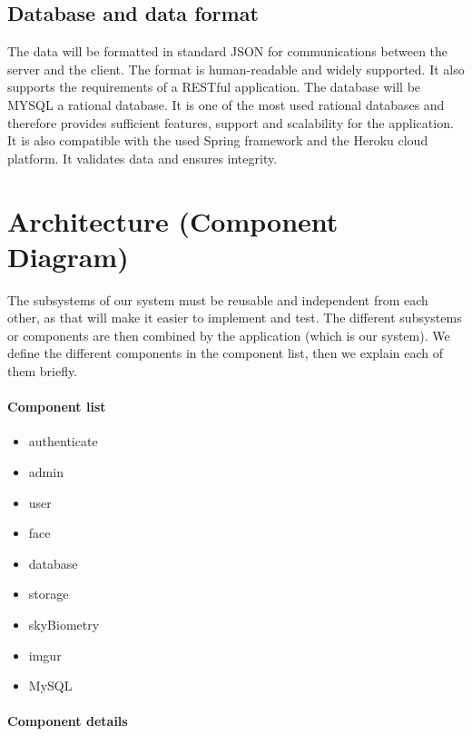 \documentclass[a4paper,11pt]{article}
\begin{document}
\subsection{Database and data format}
The data will be formatted in standard JSON for communications between the server and the client. The format is human-readable and widely supported. It also supports the requirements of a RESTful application.
\newline
\newline
\noindent
The database will be MYSQL a rational database.
It is one of the most used rational databases and therefore provides sufficient features, support and scalability for the application. It is also compatible with the used Spring framework and the Heroku cloud platform. It validates data and ensures integrity.

\section{Architecture (Component Diagram)}


The subsystems of our system must be reusable and independent from each
other, as that will make it easier to implement and test. The different
subsystems or components are then combined by the application (which is
our system). We define the different components in the component list,
then we explain each of them briefly.

\paragraph{Component list}\label{component-list}

\begin{itemize}
\item
  authenticate
\item
  admin
\item
  user
\item
  face
\item
  database
\item
  storage
\item
  skyBiometry
\item
  imgur
\item
  MySQL
\end{itemize}

\paragraph{Component details}\label{component-details}
\end{document}
